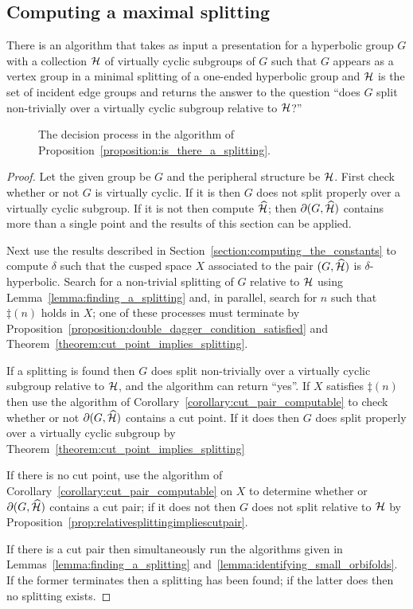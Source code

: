 \subsection{Computing a maximal splitting}

\begin{proposition}\label{proposition:is_there_a_splitting} 
  There is an algorithm that takes as input a presentation for a hyperbolic group $G$ with a collection $\mathcal{H}$ of virtually cyclic subgroups of $G$ such that $G$ appears as a vertex group in a minimal splitting of a one-ended hyperbolic group and $\mathcal{H}$ is the set of incident edge groups and returns the answer to the question ``does $G$ split non-trivially over a virtually cyclic subgroup relative to $\mathcal{H}$?''
\end{proposition}

\begin{figure}
\centering 

\caption{The decision process in the algorithm of Proposition~\ref{proposition:is_there_a_splitting}.}
\end{figure}

\begin{proof} 
Let the given group be $G$ and the peripheral structure be $\mathcal{H}$. 
First check whether or not $G$ is virtually cyclic. 
If it is then $G$ does not split properly over a virtually cyclic subgroup.  
If it is not then compute $\widehat{\mathcal{H}}$; then $\partial(G, \widehat{\mathcal{H}})$ contains more than a single point and the results of this section can be applied.

Next use the results described in Section~\ref{section:computing_the_constants} to compute $\delta$ such that the cusped space $X$ associated to the pair $(G, \widehat{\mathcal{H}})$ is $\delta$-hyperbolic. 
Search for a non-trivial splitting of $G$ relative to $\mathcal{H}$ using Lemma~\ref{lemma:finding_a_splitting} and, in parallel, search for $n$ such that $\ddag(n)$ holds in $X$; one of these processes must terminate by Proposition~\ref{proposition:double_dagger_condition_satisfied} and Theorem~\ref{theorem:cut_point_implies_splitting}.

If a splitting is found then $G$ does split non-trivially over a virtually cyclic subgroup relative to $\mathcal{H}$, and the algorithm can return ``yes''. 
If $X$ satisfies $\ddag(n)$ then use the algorithm of Corollary~\ref{corollary:cut_pair_computable} to check whether or not $\partial(G, \widehat{\mathcal{H}})$ contains a cut point. 
If it does then $G$ does split properly over a virtually cyclic subgroup by Theorem~\ref{theorem:cut_point_implies_splitting}

If there is no cut point, use the algorithm of Corollary~\ref{corollary:cut_pair_computable} on $X$ to determine whether or $\partial(G, \widehat{\mathcal{H}})$ contains a cut pair; if it does not then $G$ does not split relative to $\mathcal{H}$ by Proposition~\ref{prop:relativesplittingimpliescutpair}.

If there is a cut pair then simultaneously run the algorithms given in Lemmas~\ref{lemma:finding_a_splitting} and~\ref{lemma:identifying_small_orbifolds}. 
If the former terminates then a splitting has been found; if the latter does then no splitting exists.
\end{proof}

